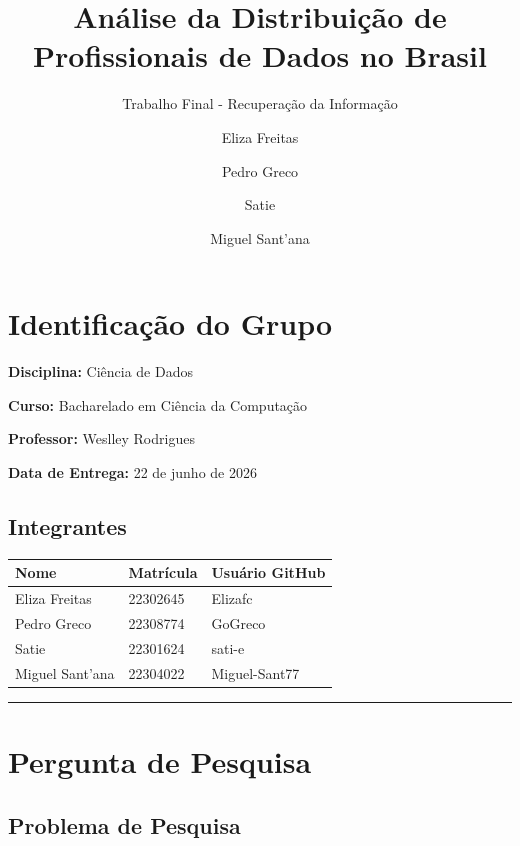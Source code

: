 \documentclass[
  11pt,
  letterpaper,
  DIV=11,
  numbers=noendperiod]{scrartcl}
\title{Análise da Distribuição de Profissionais de Dados no Brasil}
\subtitle{Trabalho Final - Recuperação da Informação}
\author{Eliza Freitas \and Pedro Greco \and Satie \and Miguel Sant'ana}
\date{}
\newcounter{none} %
\renewcommand*\contentsname{Table of contents}
\newcommand\contentsname{Table of contents}
\begin{document}
\maketitle

\renewcommand*\contentsname{Table of contents}
{
\setcounter{tocdepth}{3}
\tableofcontents
}

\section{Identificação do Grupo}\label{identificauxe7uxe3o-do-grupo}

\textbf{Disciplina:} Ciência de Dados

\textbf{Curso:} Bacharelado em Ciência da Computação

\textbf{Professor:} Weslley Rodrigues

\textbf{Data de Entrega:} 22 de junho de 2026

\subsection{Integrantes}\label{integrantes}

{\def\LTcaptype{none} %
\begin{longtable}[]{@{}lll@{}}
\toprule\noalign{}
Nome & Matrícula & Usuário GitHub \\
\midrule\noalign{}
\endhead
\bottomrule\noalign{}
\endlastfoot
Eliza Freitas & 22302645 & Elizafc \\
Pedro Greco & 22308774 & GoGreco \\
Satie & 22301624 & sati-e \\
Miguel Sant'ana & 22304022 & Miguel-Sant77 \\
\end{longtable}
}

\begin{center}\rule{0.5\linewidth}{0.5pt}\end{center}

\section{Pergunta de Pesquisa}\label{pergunta-de-pesquisa}

\subsection{Problema de Pesquisa}\label{problema-de-pesquisa}
\end{document}
